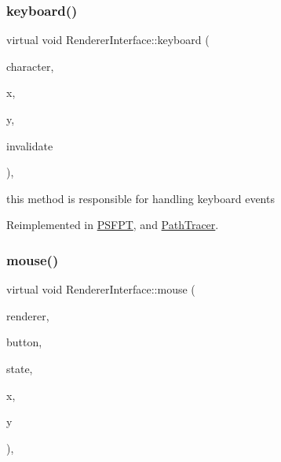 \mbox{\label{struct_renderer_interface_a9f5afd3701d8d935a2ecf08fb9f5f604}} 
\subsubsection{\texorpdfstring{keyboard()}{keyboard()}}
{\footnotesize\ttfamily virtual void Renderer\+Interface\+::keyboard (\begin{DoxyParamCaption}\item[{unsigned char}]{character,  }\item[{int}]{x,  }\item[{int}]{y,  }\item[{bool \&}]{invalidate }\end{DoxyParamCaption})\hspace{0.3cm}{\ttfamily [inline]}, {\ttfamily [virtual]}}

this method is responsible for handling keyboard events 

Reimplemented in \hyperlink{struct_p_s_f_p_t_a361baa29c599173c9517464bc534c886}{P\+S\+F\+PT}, and \hyperlink{group___p_t_module_details_gad08f55d7ba075e0b71a4aa729c07986d}{Path\+Tracer}.

\mbox{\label{struct_renderer_interface_aae7f55e0f8863e6a2ed3205d228ab306}} 
\subsubsection{\texorpdfstring{mouse()}{mouse()}}
{\footnotesize\ttfamily virtual void Renderer\+Interface\+::mouse (\begin{DoxyParamCaption}\item[{\hyperlink{struct_rendering_context}{Rendering\+Context} \&}]{renderer,  }\item[{int}]{button,  }\item[{int}]{state,  }\item[{int}]{x,  }\item[{int}]{y }\end{DoxyParamCaption})\hspace{0.3cm}{\ttfamily [inline]}, {\ttfamily [virtual]}}

